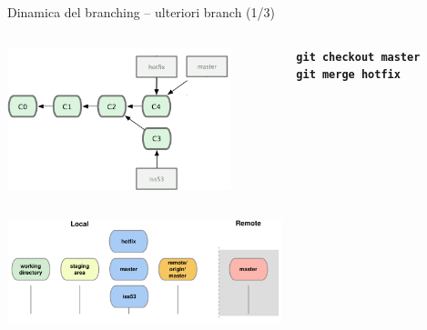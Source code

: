 \documentclass{beamer}
\begin{document}
\begin{frame}{\centerline{Dinamica del branching -- ulteriori branch (1/3)}}
  \begin{columns}
    \begin{column}{0.6\linewidth}
      \begin{center}
        \includegraphics[width=6.5cm]{UniBo.IDSEPC.A2023.LavoroCondiviso/18333fig0314c-tn}
      \end{center}
    \end{column}
    \begin{column}{0.45\linewidth}
      \begin{center}
        \texttt{\textbf{git checkout master}}\\
        \texttt{\textbf{git merge hotfix}}\\
      \end{center}
    \end{column}
  \end{columns}
  \begin{center}
    \includegraphics[width=8cm]{UniBo.IDSEPC.A2023.LavoroCondiviso/git-branch2}
  \end{center}
\end{frame}
\end{document}
